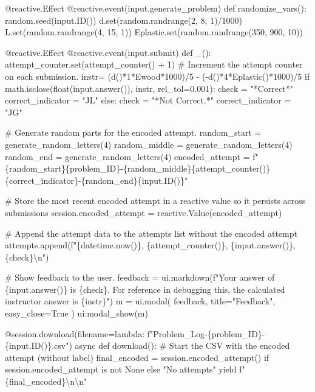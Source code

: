 \documentclass[
  letterpaper,
  DIV=11,
  numbers=noendperiod]{scrreprt}
\newenvironment{Shaded}{\begin{snugshade}}{\end{snugshade}}
\newcommand{\NormalTok}[1]{\textcolor[rgb]{0.00,0.23,0.31}{#1}}
\begin{document}
\begin{Shaded}
\begin{Highlighting}[]
\NormalTok{    @reactive.Effect}
\NormalTok{    @reactive.event(input.generate\_problem)}
\NormalTok{    def randomize\_vars():}
\NormalTok{        random.seed(input.ID())}
\NormalTok{        d.set(random.randrange(2, 8, 1)/1000)}
\NormalTok{        L.set(random.randrange(4, 15, 1))}
\NormalTok{        Eplastic.set(random.randrange(350, 900, 10))}
       
        
\NormalTok{    @reactive.Effect}
\NormalTok{    @reactive.event(input.submit)}
\NormalTok{    def \_():}
\NormalTok{        attempt\_counter.set(attempt\_counter() + 1)  \# Increment the attempt counter on each submission.}
\NormalTok{        instr= (d()*1*Ewood*1000)/5 {-} ({-}d()*4*Eplastic()*1000)/5 }
\NormalTok{        if math.isclose(float(input.answer()), instr, rel\_tol=0.001):}
\NormalTok{            check = "*Correct*"}
\NormalTok{            correct\_indicator = "JL"}
\NormalTok{        else:}
\NormalTok{            check = "*Not Correct.*"}
\NormalTok{            correct\_indicator = "JG"}

\NormalTok{        \# Generate random parts for the encoded attempt.}
\NormalTok{        random\_start = generate\_random\_letters(4)}
\NormalTok{        random\_middle = generate\_random\_letters(4)}
\NormalTok{        random\_end = generate\_random\_letters(4)}
\NormalTok{        encoded\_attempt = f"\{random\_start\}\{problem\_ID\}{-}\{random\_middle\}\{attempt\_counter()\}\{correct\_indicator\}{-}\{random\_end\}\{input.ID()\}"}

\NormalTok{        \# Store the most recent encoded attempt in a reactive value so it persists across submissions}
\NormalTok{        session.encoded\_attempt = reactive.Value(encoded\_attempt)}

\NormalTok{        \# Append the attempt data to the attempts list without the encoded attempt}
\NormalTok{        attempts.append(f"\{datetime.now()\}, \{attempt\_counter()\}, \{input.answer()\}, \{check\}\textbackslash{}n")}

\NormalTok{        \# Show feedback to the user.}
\NormalTok{        feedback = ui.markdown(f"Your answer of \{input.answer()\} is \{check\}. For reference in debugging this, the calculated instructor answer is \{instr\}")}
\NormalTok{        m = ui.modal(}
\NormalTok{            feedback,}
\NormalTok{            title="Feedback",}
\NormalTok{            easy\_close=True}
\NormalTok{        )}
\NormalTok{        ui.modal\_show(m)}

\NormalTok{    @session.download(filename=lambda: f"Problem\_Log{-}\{problem\_ID\}{-}\{input.ID()\}.csv")}
\NormalTok{    async def download():}
\NormalTok{        \# Start the CSV with the encoded attempt (without label)}
\NormalTok{        final\_encoded = session.encoded\_attempt() if session.encoded\_attempt is not None else "No attempts"}
\NormalTok{        yield f"\{final\_encoded\}\textbackslash{}n\textbackslash{}n"}
        

\end{Highlighting}
\end{Shaded}
\end{document}
